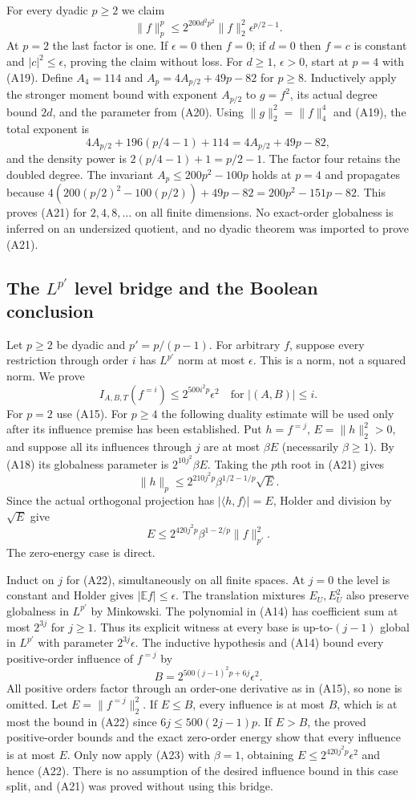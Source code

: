 For every dyadic $p\ge2$ we claim
\[
 \|f\|_p^p\le2^{200d^2p^2}\|f\|_2^2
                         \epsilon^{p/2-1}.         \tag{A21}
\]
At $p=2$ the last factor is one. If $\epsilon=0$ then $f=0$; if $d=0$
then $f=c$ is constant and $|c|^2\le\epsilon$, proving the claim
without loss. For $d\ge1$, $\epsilon>0$, start at $p=4$ with (A19).
Define $A_4=114$ and $A_p=4A_{p/2}+49p-82$ for $p\ge8$.
Inductively apply the stronger moment bound with exponent $A_{p/2}$
to $g=f^2$, its actual degree bound $2d$, and the parameter from (A20).
Using $\|g\|_2^2=\|f\|_4^4$ and (A19), the total exponent is
\[
 4A_{p/2}+196(p/4-1)+114=4A_{p/2}+49p-82,
\]
and the density power is $2(p/4-1)+1=p/2-1$.
The factor four retains the doubled degree. The invariant
$A_p\le200p^2-100p$ holds at $p=4$ and propagates because
$4(200(p/2)^2-100(p/2))+49p-82=200p^2-151p-82$.
This proves (A21) for $2,4,8,\ldots$ on all finite dimensions.
No exact-order globalness is inferred on an undersized quotient, and
no dyadic theorem was imported to prove (A21).

\subsection{The $L^{p'}$ level bridge and the Boolean conclusion}
Let $p\ge2$ be dyadic and $p'=p/(p-1)$. For arbitrary $f$, suppose every
restriction through order $i$ has $L^{p'}$ norm at most $\epsilon$.
This is a norm, not a squared norm. We prove
\[
 I_{A,B,T}(f^{=i})\le2^{500i^2p}\epsilon^2
 \quad\text{for }|(A,B)|\le i.                     \tag{A22}
\]
For $p=2$ use (A15). For $p\ge4$ the following duality estimate will be
used only after its influence premise has been established.
Put $h=f^{=j}$, $E=\|h\|_2^2>0$, and suppose all its influences through
$j$ are at most $\beta E$ (necessarily $\beta\ge1$).
By (A18) its globalness parameter is $2^{10j^2}\beta E$.
Taking the $p$th root in (A21) gives
\[
 \|h\|_p\le2^{210j^2p}\beta^{1/2-1/p}\sqrt E.
\]
Since the actual orthogonal projection has $|\langle h,f\rangle|=E$,
Holder and division by $\sqrt E$ give
\[
 E\le2^{420j^2p}\beta^{1-2/p}\|f\|_{p'}^2.          \tag{A23}
\]
The zero-energy case is direct.

Induct on $j$ for (A22), simultaneously on all finite spaces.
At $j=0$ the level is constant and Holder gives $|\mathbb Ef|\le\epsilon$.
The translation mixtures $E_U,E_U^2$ also preserve globalness in
$L^{p'}$ by Minkowski. The polynomial in (A14) has coefficient sum at
most $2^{3j}$ for $j\ge1$. Thus its explicit witness at every base is
up-to-$(j-1)$ global in $L^{p'}$ with parameter $2^{3j}\epsilon$.
The inductive hypothesis and (A14) bound every positive-order influence
of $f^{=j}$ by
\[
 B=2^{500(j-1)^2p+6j}\epsilon^2.
\]
All positive orders factor through an order-one derivative as in
(A15), so none is omitted. Let $E=\|f^{=j}\|_2^2$.
If $E\le B$, every influence is at most $B$, which is at most the bound
in (A22) since $6j\le500(2j-1)p$.
If $E>B$, the proved positive-order bounds and the exact zero-order
energy show that every influence is at most $E$. Only now apply (A23)
with $\beta=1$, obtaining $E\le2^{420j^2p}\epsilon^2$ and hence (A22).
There is no assumption of the desired influence bound in this case
split, and (A21) was proved without using this bridge.

